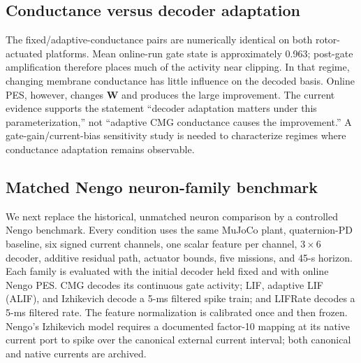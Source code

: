 \documentclass[10pt,twocolumn]{article}
\begin{document}
\subsection{Conductance versus decoder adaptation}

The fixed/adaptive-conductance pairs are numerically identical on both
rotor-actuated platforms. Mean online-run gate state is approximately 0.963;
post-gate amplification therefore places much of the activity near clipping.
In that regime, changing membrane conductance has little influence on the
decoded basis. Online PES, however, changes $\bm W$ and produces the large
improvement. The current evidence supports the statement ``decoder adaptation
matters under this parameterization,'' not ``adaptive CMG conductance
causes the improvement.'' A gate-gain/current-bias sensitivity study is needed
to characterize regimes where conductance adaptation remains observable.

\subsection{Matched Nengo neuron-family benchmark}

We next replace the historical, unmatched neuron comparison by a controlled
Nengo benchmark.  Every condition uses the same MuJoCo plant, quaternion-PD
baseline, six signed current channels, one scalar feature per channel, $3\times6$
decoder, additive residual path, actuator bounds, five missions, and 45-s
horizon.  Each family is evaluated with the initial decoder held fixed and with
online Nengo PES.  CMG decodes its continuous gate activity; LIF, adaptive LIF
(ALIF), and Izhikevich decode a 5-ms filtered spike train; and LIFRate decodes a
5-ms filtered rate.  The feature normalization is calibrated once and then
frozen.  Nengo's Izhikevich model requires a documented factor-10 mapping at its
native current port to spike over the canonical external current interval; both
canonical and native currents are archived.

\begin{table}[t]
\centering
\caption{Matched 45-s Nengo benchmark, averaged over Roll, Full3, Hard45,
Hardstep, and Yaw360.  Entries are mean q-error improvement over PD; $u_r$ is
RMS residual torque normalized axiswise by the declared torque limits.}
\label{tab:nengo-family}
\small
{}
\end{table}
\end{document}
